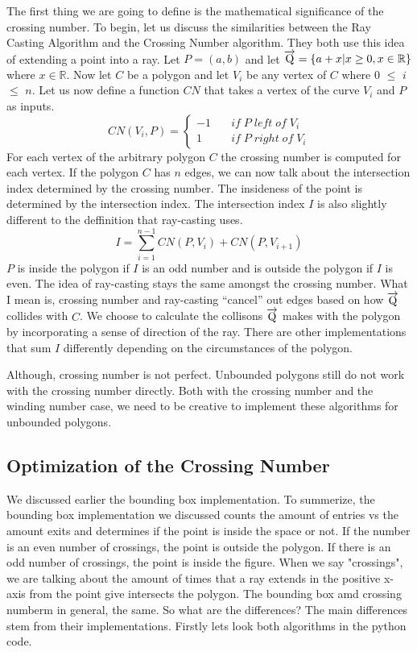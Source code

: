 \documentclass{article}
\begin{document}
The first thing we are going to define is the mathematical significance of the crossing number.
To begin, let us discuss the similarities between the Ray Casting Algorithm and the Crossing Number algorithm.
They both use this idea of extending a point into a ray.
Let $P=(a,b)$ and let $\overrightarrow{\rm Q} = \{ a + x | x \geq 0, x \in \mathbb{R} \}$ where $x \in \mathbb{R}$.
Now let $C$ be a polygon and let $V_i$ be any vertex of $C$ where $0$ $\leq$ $i$ $\leq$ $n$.
Let us now define a function $CN$ that takes a vertex of the curve $V_i$ and $P$ as inputs.
$$
    CN(V_i,P) =\left\{
                \begin{array}{ll}
                    -1 & \quad if\; P \; left \; of \; V_i\\
                    1 & \quad if\; P \; right \; of \; V_i
                \end{array}
            \right.
$$
For each vertex of the arbitrary polygon $C$ the crossing number is computed for each vertex.
If the polygon $C$ has $n$ edges, we can now talk about the intersection index determined by the crossing number.
The insideness of the point is determined by the intersection index.
The intersection index $I$ is also slightly different to the deffinition that ray-casting uses.
$$
    I = \sum_{i=1}^{n-1} CN(P,V_i) + CN(P, V_{i+1})
$$
$P$ is inside the polygon if $I$ is an odd number and is outside the polygon if $I$ is even.
The idea of ray-casting stays the same amongst the crossing number.
What I mean is, crossing number and ray-casting ``cancel'' out edges based on how $\overrightarrow{\rm Q}$ collides with $C$.
We choose to calculate the collisons $\overrightarrow{\rm Q}$ makes with the polygon by incorporating a sense of direction of the ray.
There are other implementations that sum $I$ differently depending on the circumstances of the polygon.

Although, crossing number is not perfect.
Unbounded polygons still do not work with the crossing number directly.
Both with the crossing number and the winding number case, we need to be creative to implement these algorithms for unbounded polygons.




\subsection{Optimization of the Crossing Number}
We discussed earlier the bounding box implementation.
To summerize, the bounding box implementation we discussed counts the amount of entries vs the amount exits and determines if the point is inside the space or not.
If the number is an even number of crossings, the point is outside the polygon.
If there is an odd number of crossings, the point is inside the figure.
When we say "crossings", we are talking about the amount of times that a ray extends in the positive x-axis from the point give intersects the polygon.
The bounding box amd crossing numberm in general, the same.
So what are the differences?
The main differences stem from their implementations.
Firstly lets look both algorithms in the python code.
\end{document}
